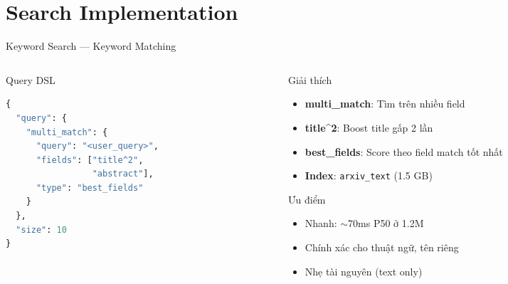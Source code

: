 \section{Search Implementation}

\begin{frame}[fragile]{Keyword Search --- Keyword Matching}
\begin{columns}[T]
\begin{column}{0.48\textwidth}

\begin{block}{Query DSL}
\begin{lstlisting}[language=Python]
{
  "query": {
    "multi_match": {
      "query": "<user_query>",
      "fields": ["title^2",
                 "abstract"],
      "type": "best_fields"
    }
  },
  "size": 10
}
\end{lstlisting}
\end{block}

\end{column}
\begin{column}{0.48\textwidth}

\begin{block}{Giải thích}
{\scriptsize
\begin{itemize}\itemsep0pt \parskip0pt 
    \item \textbf{multi\_match}: Tìm trên nhiều field
    \item \textbf{title\^{}2}: Boost title gấp 2 lần
    \item \textbf{best\_fields}: Score theo field match tốt nhất
    \item \textbf{Index}: \texttt{arxiv\_text} (1.5 GB)
\end{itemize}
}
\end{block}

\vspace{0.1cm}

\begin{exampleblock}{Ưu điểm}
{\scriptsize
\begin{itemize}\itemsep0pt \parskip0pt 
    \item Nhanh: $\sim$70ms P50 ở 1.2M
    \item Chính xác cho thuật ngữ, tên riêng
    \item Nhẹ tài nguyên (text only)
\end{itemize}
}
\end{exampleblock}

\end{column}
\end{columns}
\end{frame}

